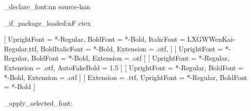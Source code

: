 

\elegant_declare_font:nn { source-han }
  {
    \elegant_if_package_loaded:nF { ctex }
      { \RequirePackage[UTF8, fontset = none]{ctex} }

    [
      UprightFont = *-Regular,
      BoldFont = *-Bold,
      ItalicFont = LXGWWenKai-Regular.ttf,
      BoldItalicFont = *-Bold,
      Extension = .otf,
    ]
    [
      UprightFont = *-Regular,
      BoldFont = *-Bold,
      Extension = .otf
    ]
    [
      UprightFont = *-Regular,
      Extension = .otf,
      AutoFakeBold = 1.5
    ]
    [
      UprightFont = *-Regular,
      BoldFont = *-Bold,
      Extension = .otf
    ]
    [
      Extension = .ttf,
      UprightFont = *-Regular,
      BoldFont = *-Bold
    ]
    \DeclareDocumentCommand {}
    \DeclareDocumentCommand {}
    \DeclareDocumentCommand {}
  }

\elegant_apply_selected_font:

\endinput
